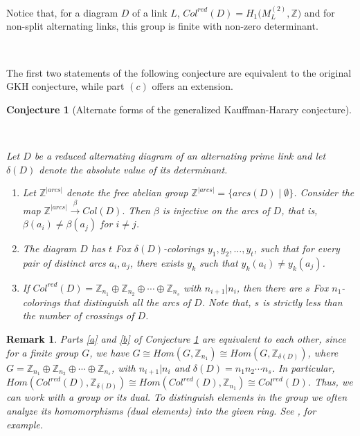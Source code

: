 \documentclass[11pt]{amsart}
\makeatletter
\def\namedlabel#1#2{\begingroup
    #2%
    \def\@currentlabel{#2}%
    \phantomsection\label{#1}\endgroup
}
\newtheorem{remark}[theorem]{Remark}
\newtheorem{conjecture}[theorem]{Conjecture}
\makeatother
\begin{document}
Notice that, for a diagram $D$ of a link $L$, $Col^{red}(D)=H_1\big(M^{(2)}_L,\mathbb Z\big)$ and for non-split alternating links, this group is finite with non-zero determinant.

\

The first two statements of the following conjecture are equivalent to the original GKH conjecture, while part $(c)$ offers an extension.

\begin{conjecture}[Alternate forms of the generalized Kauffman-Harary conjecture]\label{ConAPS} 

\ 

 Let $D$ be a reduced alternating diagram of an alternating prime link and let $\delta(D)$ denote the absolute value of its determinant.

\begin{enumerate} 

\item [\namedlabel{a}{(a)}] Let $\mathbb{Z}^{|arcs|}$ denote the free abelian group $\mathbb{Z}^{|arcs|} = \{arcs(D) \mid \emptyset \}$. Consider the map
$\mathbb{Z}^{|arcs|} \xrightarrow{\beta} Col(D).$
Then $\beta$ is injective on the arcs of $D$, that is, $\beta(a_i) \neq \beta(a_j)$ for $i \neq j$.
    
\item [\namedlabel{b}{(b)}]  The diagram $D$ has $t$ Fox $\delta(D)$-colorings $y_1, y_2, \hdots, y_t$, such that for every pair of distinct arcs $a_i, a_j$, there exists $y_k$ such that $y_k(a_i) \neq y_k(a_j)$. 

\item [\namedlabel{c}{(c)}] If $Col^{red}(D) = \mathbb Z_{n_1} \oplus \mathbb Z_{n_2} \oplus \cdots \oplus \mathbb Z_{n_s}$ with $n_{i+1} | n_i$, then there are $s$ Fox $n_1$-colorings that distinguish all the arcs of $D$. Note that, $s$ is strictly less than the number of crossings of $D$.
    
\end{enumerate}
\end{conjecture}

\begin{remark}

    Parts \ref{a} and \ref{b} of Conjecture \ref{ConAPS} are equivalent to each other, since for a finite group $G$, we have $G \cong Hom(G, \mathbb{Z}_{n_1})\cong Hom(G, \mathbb{Z}_{\delta(D)})$, where $G=\mathbb{Z}_{n_1}\oplus \mathbb Z_{n_2} \oplus \cdots \oplus \mathbb{Z}_{n_s}$, with $n_{i+1} | n_i$ and $\delta(D) =n_{1}n_{2}\cdots n_{s}$. In particular, $Hom(Col^{red}(D), \mathbb{Z}_{\delta(D)}) \cong Hom(Col^{red}(D), \mathbb{Z}_{n_1}) \cong Col^{red}(D)$. Thus, we can work with a group or its dual. To distinguish elements in the group we often analyze its homomorphisms  (dual elements) into the given ring. See \cite{lang}, for example.
    
\end{remark}
\end{document}
